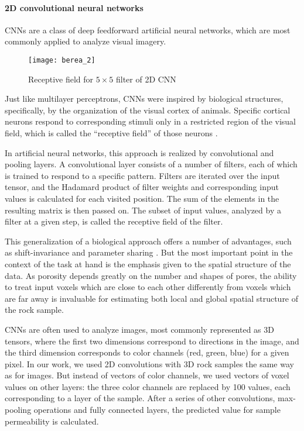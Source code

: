 \documentclass[review]{elsarticle}
\begin{document}
\paragraph{2D convolutional neural networks}

CNNs are a class of deep feedforward artificial neural networks, which are most commonly applied to analyze visual imagery.

\begin{wrapfigure}{r}{0.5\textwidth}
    \centering
    \texttt{[image: berea\_2]}
    \caption{Receptive field for $5 \times 5$ filter of 2D CNN}
\end{wrapfigure}

Just like multilayer perceptrons, CNNs were inspired by biological structures, specifically, by the organization of the visual cortex of animals. Specific cortical neurons respond to corresponding stimuli only in a restricted region of the visual field, which is called the “receptive field” of those neurons \cite{matsugu2003subject}.

In artificial neural networks, this approach is realized by convolutional and pooling layers. A convolutional layer consists of a number of filters, each of which is trained to respond to a specific pattern. Filters are iterated over the input tensor, and the Hadamard product of filter weights and corresponding input values is calculated for each visited position. The sum of the elements in the resulting matrix is then passed on. The subset of input values, analyzed by a filter at a given step, is called the receptive field of the filter.

This generalization of a biological approach offers a number of advantages, such as shift-invariance and parameter sharing \cite{lecun2015deep}. But the most important point in the context of the task at hand is the emphasis given to the spatial structure of the data. As porosity depends greatly on the number and shapes of pores, the ability to treat input voxels which are close to each other differently from voxels which are far away is invaluable for estimating both local and global spatial structure of the rock sample.

CNNs are often used to analyze images, most commonly represented as 3D tensors, where the first two dimensions correspond to directions in the image, and the third dimension corresponds to color channels (red, green, blue) for a given pixel. In our work, we used 2D convolutions with 3D rock samples the same way as for images. But instead of vectors of color channels, we used vectors of voxel values on other layers: the three color channels are replaced by 100 values, each corresponding to a layer of the sample. After a series of other convolutions, max-pooling operations and fully connected layers, the predicted value for sample permeability is calculated.
\end{document}
